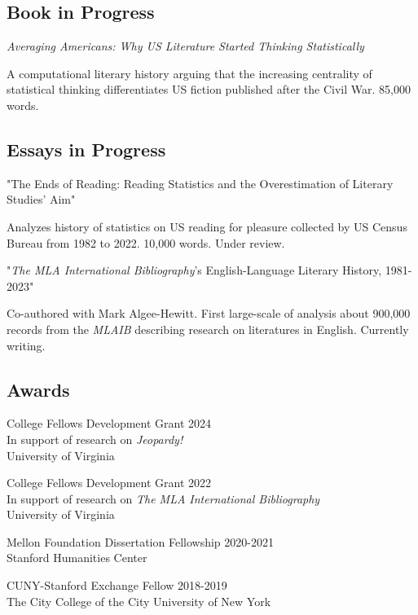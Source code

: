 \documentclass[
  12pt,
  letterpaper,
]{article}
\begin{document}
\hypertarget{book}{%
\subsection{Book in Progress}\label{book}}

\emph{Averaging Americans: Why US Literature Started Thinking Statistically}

A computational literary history arguing that the increasing centrality of statistical thinking differentiates US fiction published after the Civil War. 85,000 words.

\hypertarget{wip}{%
\subsection{Essays in Progress}\label{wip}}

"The Ends of Reading: Reading Statistics and the Overestimation of Literary Studies' Aim"

Analyzes history of statistics on US reading for pleasure collected by US Census Bureau from 1982 to 2022. 10,000 words. Under review.

"\emph{The MLA International Bibliography}'s English-Language Literary History, 1981-2023"

Co-authored with Mark Algee-Hewitt. First large-scale of analysis about 900,000 records from the \emph{MLAIB} describing research on literatures in English. Currently writing.

\hypertarget{awards}{%
\subsection{Awards}\label{awards}}

College Fellows Development Grant \hfill 2024\\
In support of research on \emph{Jeopardy!}\\
University of Virginia

College Fellows Development Grant \hfill 2022\\
In support of research on \emph{The MLA International Bibliography}\\
University of Virginia

Mellon Foundation Dissertation Fellowship \hfill 2020-2021\\
Stanford Humanities Center

CUNY-Stanford Exchange Fellow \hfill 2018-2019\\
The City College of the City University of New York
\end{document}
